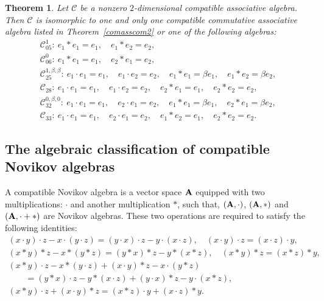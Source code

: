 \documentclass[10pt,a4paper]{amsart}
\numberwithin{equation}{section}
\newtheorem{Theorem}{Theorem}[section]
\begin{document}
\begin{Theorem}
\label{comass2}
Let $\mathcal{C}$ be a nonzero $2$-dimensional compatible associative algebra.
Then $\mathcal{C}$ is isomorphic to one and only one compatible commutative associative algebra listed in Theorem~{\rm\ref{comasscom2}} or one of the following algebras:
\begin{gather*}
\mathcal{C}_{05}^{1}\colon\ e_{1}\ast e_{1} =e_{1},\quad e_{1}\ast e_{2} = e_{2},\\
\mathcal{C}_{06}^{0}\colon\ e_{1} \ast e_{1} =e_{1}, \quad e_{2} \ast e_{1} =e_{2},\\
\mathcal{C}_{25}^{1 ,\beta , \beta }\colon\
e_{1}\cdot e_{1}=e_{1}, \quad e_{1}\cdot e_{2}= e_{2}, \quad
e_{1}\ast e_{1}=\beta e_{1}, \quad e_{1}\ast e_{2}=\beta e_{2},
\\
\mathcal{C}_{28}\colon\
e_{1}\cdot e_{1}=e_{1}, \quad e_{1}\cdot e_{2}=e_{2}, \quad
e_{2}\ast e_{1}=e_{1}, \quad e_{2}\ast e_{2}=e_{2},
\\
\mathcal{C}_{32}^{0 ,\beta ,0 }\colon\
e_{1}\cdot e_{1}=e_{1}, \quad e_{2}\cdot
e_{1}=e_{2}, \quad
e_{1}\ast e_{1}=\beta e_{1}, \quad
e_{2}\ast e_{1}=\beta e_{2},
\\
\mathcal{C}_{33}\colon\
e_{1}\cdot e_{1}=e_{1}, \quad e_{2}\cdot e_{1}=e_{2}, \quad
e_{1}\ast e_{2}=e_{1}, \quad e_{2}\ast e_{2}=e_{2}.
\end{gather*}
\end{Theorem}

\subsection{The algebraic classification of compatible Novikov algebras}

\begin{Definition}
A compatible Novikov algebra is a vector space ${\bf A}$ equipped with
two multiplications: $\cdot$ and another multiplication $\ast$,
such that, $({\bf A}, \cdot)$, $({\bf A}, \ast)$ and
$({\bf A}, \cdot+ \ast)$ are Novikov algebras.
These two operations are required to satisfy the following identities:
\begin{gather*}
 ( x\cdot y) \cdot z-x\cdot ( y\cdot
z) = ( y\cdot x) \cdot z -y\cdot ( x\cdot z) ,\quad
 (x \cdot y) \cdot z = (x \cdot z)\cdot y, \\
 ( x\ast y) \ast z-x\ast ( y\ast
z) = ( y\ast x) \ast z -y\ast ( x\ast z) ,\quad
 (x \ast y) \ast z = (x \ast z)\ast y, \\
(x\ast y)\cdot z-x\ast (y\cdot z)+(x\cdot y)\ast z-x\cdot (y\ast z) \\
\qquad =
(y\ast x)\cdot z-y\ast (x\cdot z)+(y\cdot x)\ast z-y\cdot (x\ast z) ,\\
 (x \ast y) \cdot z +(x \cdot y) \ast z = (x \ast z)\cdot y+(x \cdot z)\ast y.
 \end{gather*}
 \end{Definition}
\end{document}
